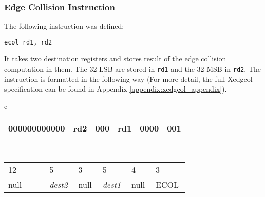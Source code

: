     


    \subsubsection{Edge Collision Instruction}
    The following instruction was defined:

    \begin{center}
    \texttt{ecol rd1, rd2}
    \end{center}

    It takes two destination registers and stores result of the edge collision computation in them. The 32 \gls{LSB} are stored in \texttt{rd1} and the 32 \gls{MSB} in \texttt{rd2}.
    The instruction is formatted in the following way (For more detail, the full Xedgcol specification can be found in Appendix \ref{appendix:xedgcol_appendix}).

    \begin{table}[H]
    \begin{center}
    \begin{tabular}{c}
        \begin{tabular}{|m{0.2\linewidth}|m{0.1\linewidth}|m{0.1\linewidth}|m{0.1\linewidth}|m{0.1\linewidth}|m{0.1\linewidth}|}
        \hline
        \hspace*{0.5cm}000000000000 & \hspace*{0.5cm}rd2  & \hspace*{0.5cm}000  & \hspace*{0.5cm}rd1  & \hspace*{0.5cm}0000  & \hspace*{0.5cm}001  \\
        \hline
        \end{tabular} \\
        \begin{tabular}{m{0.2\linewidth}m{0.1\linewidth}m{0.1\linewidth}m{0.1\linewidth}m{0.1\linewidth}m{0.1\linewidth}}
        \hspace*{1.5cm}12 & \hspace*{0.5cm}5  & \hspace*{0.5cm}3  & \hspace*{0.5cm}5  & \hspace*{0.5cm}4  & \hspace*{0.5cm}3  \\
        \hspace*{1.3cm}null &  \hspace*{0.5cm}\textit{dest2} & \hspace*{0.5cm}null  & \hspace*{0.5cm}\textit{dest1}  &  \hspace*{0.5cm}null & \hspace*{0.25cm}ECOL  \\
        \end{tabular}
    \end{tabular}
    \end{center}
    \end{table}

